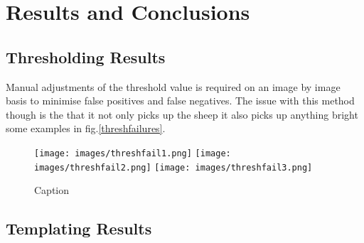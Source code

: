 \chapter{Results and Conclusions}
\begin{comment}
This section should discuss issues you encountered as you tried to implement your experiments. What were the results of running the experiments? What conclusions can you draw from these results? What graphs or other information have you assessed regarding your experiments? Discuss those.

During the work, you might have found that elements of your experiments were unnecessary or overly complex; perhaps third-party libraries were available that simplified some of the functions that you intended to implement. If things were easier in some areas, then how did you adapt your project to take account of your findings?

It is more likely that things were more complex than you first thought. In particular, were there any problems or difficulties that you found during implementation that you had to address? Did such problems simply delay you or were they more significant?

If you had multiple experiments to run, it may be sensible to discuss each experiment in separate sections.
\end{comment}
\section{Thresholding Results}

Manual adjustments of the threshold value is required on an image by image basis to minimise false positives and false negatives. The issue with this method though is the that it not only picks up the sheep it also picks up anything bright some examples in fig.\ref{threshfailures}.
    
    \begin{figure}
        \centering
        \texttt{[image: images/threshfail1.png]}
        \texttt{[image: images/threshfail2.png]}
        \texttt{[image: images/threshfail3.png]}
        \caption{Caption}
        \label{fig:my_label}
    \end{figure}


\section{Templating Results}


